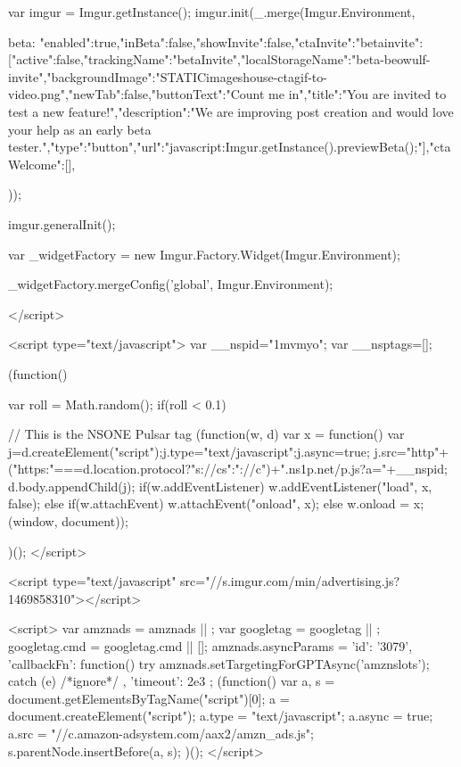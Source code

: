 {{            var imgur = Imgur.getInstance();
            imgur.init(_.merge(Imgur.Environment, {
                
                
                beta: {"enabled":true,"inBeta":false,"showInvite":false,"ctaInvite":{"betainvite":[{"active":false,"trackingName":"betaInvite","localStorageName":"beta-beowulf-invite","backgroundImage":"{STATIC}\/images\/house-cta\/gif-to-video.png","newTab":false,"buttonText":"Count me in","title":"You are invited to test a new feature!","description":"We are improving post creation and would love your help as an early beta tester.","type":"button","url":"javascript:Imgur.getInstance().previewBeta();"}]},"ctaWelcome":[]},
            }));

            imgur.generalInit();

            

            var _widgetFactory = new Imgur.Factory.Widget(Imgur.Environment);

            _widgetFactory.mergeConfig('global', Imgur.Environment);

            
        </script>

        <script type="text/javascript">
            var __nspid="1mvmyo";
            var __nsptags=[];

            (function() {
                var roll = Math.random();
                if(roll < 0.1) {
                    
                        // This is the NSONE Pulsar tag
                        (function(w, d) { var x = function() {
                        var j=d.createElement("script");j.type="text/javascript";j.async=true;
                        j.src="http"+("https:"===d.location.protocol?"s://cs":"://c")+".ns1p.net/p.js?a="+__nspid;
                        d.body.appendChild(j); }
                        if(w.addEventListener) { w.addEventListener("load", x, false); }
                        else if(w.attachEvent) { w.attachEvent("onload", x); }
                        else { w.onload = x; }
                        }(window, document));

                    
                }
            })();
        </script>

    

                        <script type="text/javascript" src="//s.imgur.com/min/advertising.js?1469858310"></script>

<script>
    var amznads = amznads || { };
    var googletag = googletag || { };
    googletag.cmd = googletag.cmd || [];
    amznads.asyncParams = {
        'id': '3079',
        'callbackFn': function() {
            try {
                amznads.setTargetingForGPTAsync('amznslots');
            } catch (e) { /*ignore*/ }
        },
        'timeout': 2e3
    };
    (function() {
        var a, s = document.getElementsByTagName("script")[0];
        a = document.createElement("script");
        a.type = "text/javascript";
        a.async = true;
        a.src = "//c.amazon-adsystem.com/aax2/amzn_ads.js";
        s.parentNode.insertBefore(a, s);
    })();
</script>

}}
